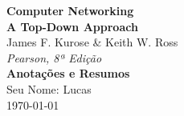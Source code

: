 \documentclass[12pt]{article}
\begin{document}
\begin{titlepage}
    \begin{center}
        {\Huge\bfseries\color{kuroseBlue}Computer Networking}\\
        \vspace{0.4cm}
        {\Large\textbf{\color{kuroseGray}A Top-Down Approach}}\\
        \vspace{0.2cm}
        {\large\color{kuroseBlue}James F. Kurose \& Keith W. Ross}\\
        {\color{kuroseGray}\textit{Pearson, 8ª Edição}}\\
        \vspace{1cm}
        {\large\textbf{Anotações e Resumos}}\\
        \vfill
        {\large\color{kuroseBlue}Seu Nome: Lucas}\\
        \vspace{0.5cm}
        \today
    \end{center}
    \tableofcontents
    \thispagestyle{empty}
\end{titlepage}


\end{document}

